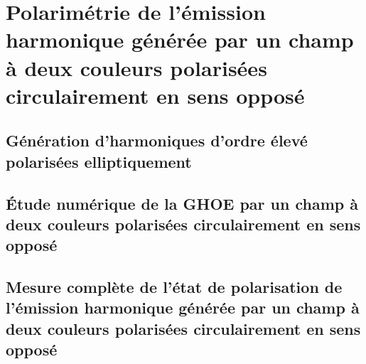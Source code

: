 \part{Polarimétrie de l'émission harmonique générée par un champ à deux couleurs polarisées circulairement en sens opposé}
\label{part:Polarimétrie}

\chapter{Génération d'harmoniques d'ordre élevé polarisées elliptiquement}


\chapter{\'{E}tude numérique de la GHOE par un champ à deux couleurs polarisées circulairement en sens opposé}

\chapter{Mesure complète de l'état de polarisation de l'émission harmonique générée par un champ à deux couleurs polarisées circulairement en sens opposé}